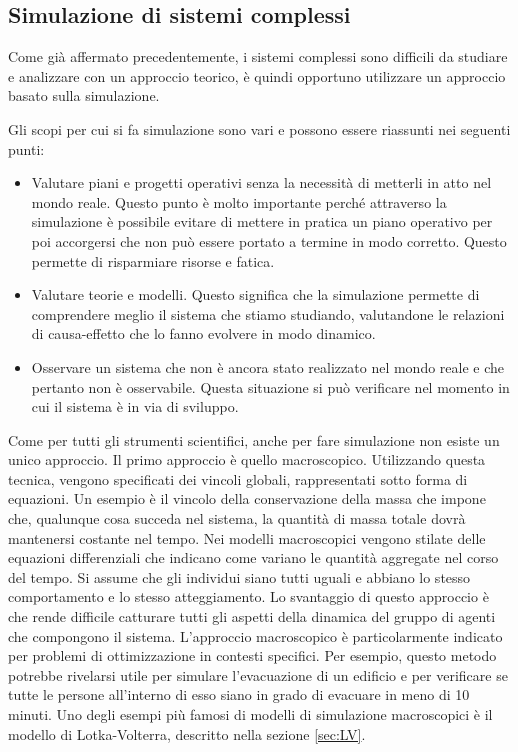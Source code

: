 \documentclass[11pt]{article}
\begin{document}
\subsection{Simulazione di sistemi complessi}
Come già affermato precedentemente, i sistemi complessi sono difficili da studiare e analizzare con un approccio teorico, è quindi opportuno utilizzare un approccio basato sulla simulazione. 

Gli scopi per cui si fa simulazione sono vari e possono essere riassunti nei seguenti punti:
\begin{itemize}
    \item Valutare piani e progetti operativi senza la necessità di metterli in atto nel mondo reale. Questo punto è molto importante perché attraverso la simulazione è possibile evitare di mettere in pratica un piano operativo per poi accorgersi che non può essere portato a termine in modo corretto. Questo permette di risparmiare risorse e fatica.
    \item Valutare teorie e modelli. Questo significa che la simulazione permette di comprendere meglio il sistema che stiamo studiando, valutandone le relazioni di causa-effetto che lo fanno evolvere in modo dinamico.
    \item Osservare un sistema che non è ancora stato realizzato nel mondo reale e che pertanto non è osservabile. Questa situazione si può verificare nel momento in cui il sistema è in via di sviluppo.
\end{itemize}

Come per tutti gli strumenti scientifici, anche per fare simulazione non esiste un unico approccio. Il primo approccio è quello macroscopico. Utilizzando questa tecnica, vengono specificati dei vincoli globali, rappresentati sotto forma di equazioni. Un esempio è il vincolo della conservazione della massa che impone che, qualunque cosa succeda nel sistema, la quantità di massa totale dovrà mantenersi costante nel tempo. Nei modelli macroscopici vengono stilate delle equazioni differenziali che indicano come variano le quantità aggregate nel corso del tempo. Si assume che gli individui siano tutti uguali e abbiano lo stesso comportamento e lo stesso atteggiamento. Lo svantaggio di questo approccio è che rende difficile catturare tutti gli aspetti della dinamica del gruppo di agenti che compongono il sistema. L'approccio macroscopico è particolarmente indicato per problemi di ottimizzazione in contesti specifici. Per esempio, questo metodo potrebbe rivelarsi utile per simulare l'evacuazione di un edificio e per verificare se tutte le persone all'interno di esso siano in grado di evacuare in meno di 10 minuti.
Uno degli esempi più famosi di modelli di simulazione macroscopici è il modello di Lotka-Volterra, descritto nella sezione \ref{sec:LV}. 
\end{document}

